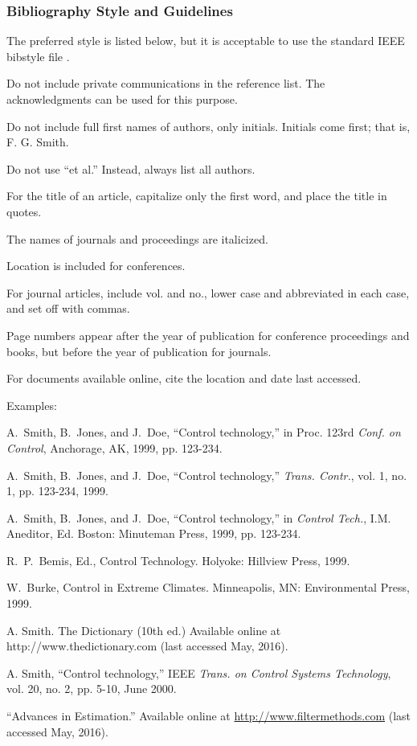 \subsubsection{Bibliography Style and Guidelines}
The preferred style is listed below, but it is acceptable to use the standard IEEE bibstyle file \cite{BIB}.
\bi
\item Do not include private communications in the reference list.  The acknowledgments can be used for this purpose.
\item  Do not include full first names of authors, only initials.  Initials come first; that is, F. G. Smith.
\item  Do not use ``et al.''  Instead, always list all authors.
\item  For the title of an article, capitalize only the first word, and place the title in quotes.
\item  The names of journals and proceedings are italicized.
\item  Location is included for conferences.
\item  For journal articles, include vol. and no., lower case and abbreviated in each case, and set off with commas.  
\item Page numbers appear after the year of publication for conference proceedings and books, but before the year of publication for journals.
\item For documents available online, cite the location and date last accessed.
\ei

\noindent
Examples:
\bi
\item[] [1]	A.\ Smith, B.\ Jones, and J.\ Doe, ``Control technology,'' in Proc. 123rd \textit{Conf. on Control}, Anchorage, AK, 1999, pp. 123-234.
\item[] [2]	A.\ Smith, B.\ Jones, and J.\ Doe, ``Control technology,'' \textit{Trans. Contr.}, vol. 1, no. 1, pp. 123-234, 1999.
\item[] [3]	A.\ Smith, B.\ Jones, and J.\ Doe, ``Control technology,'' in \textit{Control Tech.}, I.M. Aneditor, Ed. Boston: Minuteman Press, 1999, pp. 123-234.
\item[] [4]	R.\ P.\ Bemis, Ed., Control Technology. Holyoke: Hillview Press, 1999.
\item[] [5]  W.\ Burke, Control in Extreme Climates. Minneapolis, MN: Environmental Press, 1999. 
\item[] [6]	A. Smith. The Dictionary (10th ed.) Available online at http://www.thedictionary.com (last accessed May, 2016).
\item[] [7]	A. Smith, “Control technology,” IEEE \textit{Trans. on Control Systems Technology},   vol. 20, no. 2, pp. 5-10, June 2000. 
\item[] [8]   “Advances in Estimation.”  Available online at \url{http://www.filtermethods.com} (last accessed May, 2016).
\ei